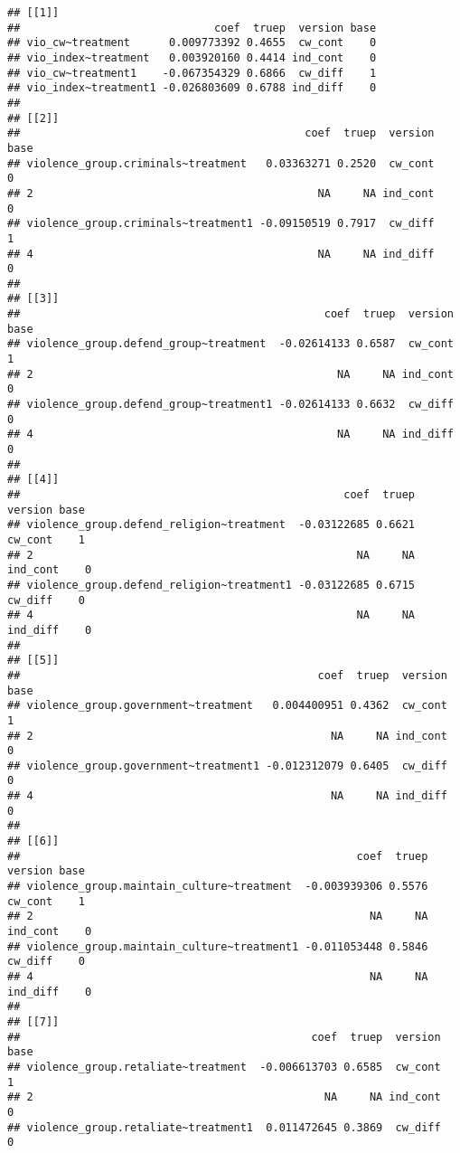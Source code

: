 \documentclass[
]{article}
\begin{document}
\begin{verbatim}
## [[1]]
##                              coef  truep  version base
## vio_cw~treatment      0.009773392 0.4655  cw_cont    0
## vio_index~treatment   0.003920160 0.4414 ind_cont    0
## vio_cw~treatment1    -0.067354329 0.6866  cw_diff    1
## vio_index~treatment1 -0.026803609 0.6788 ind_diff    0
## 
## [[2]]
##                                            coef  truep  version base
## violence_group.criminals~treatment   0.03363271 0.2520  cw_cont    0
## 2                                            NA     NA ind_cont    0
## violence_group.criminals~treatment1 -0.09150519 0.7917  cw_diff    1
## 4                                            NA     NA ind_diff    0
## 
## [[3]]
##                                               coef  truep  version base
## violence_group.defend_group~treatment  -0.02614133 0.6587  cw_cont    1
## 2                                               NA     NA ind_cont    0
## violence_group.defend_group~treatment1 -0.02614133 0.6632  cw_diff    0
## 4                                               NA     NA ind_diff    0
## 
## [[4]]
##                                                  coef  truep  version base
## violence_group.defend_religion~treatment  -0.03122685 0.6621  cw_cont    1
## 2                                                  NA     NA ind_cont    0
## violence_group.defend_religion~treatment1 -0.03122685 0.6715  cw_diff    0
## 4                                                  NA     NA ind_diff    0
## 
## [[5]]
##                                              coef  truep  version base
## violence_group.government~treatment   0.004400951 0.4362  cw_cont    1
## 2                                              NA     NA ind_cont    0
## violence_group.government~treatment1 -0.012312079 0.6405  cw_diff    0
## 4                                              NA     NA ind_diff    0
## 
## [[6]]
##                                                    coef  truep  version base
## violence_group.maintain_culture~treatment  -0.003939306 0.5576  cw_cont    1
## 2                                                    NA     NA ind_cont    0
## violence_group.maintain_culture~treatment1 -0.011053448 0.5846  cw_diff    0
## 4                                                    NA     NA ind_diff    0
## 
## [[7]]
##                                             coef  truep  version base
## violence_group.retaliate~treatment  -0.006613703 0.6585  cw_cont    1
## 2                                             NA     NA ind_cont    0
## violence_group.retaliate~treatment1  0.011472645 0.3869  cw_diff    0

\end{verbatim}
\end{document}

